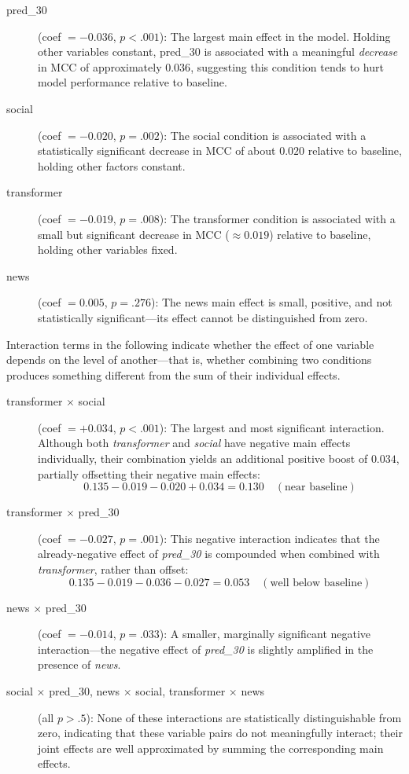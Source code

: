 \documentclass[stu,floatsintext]{apa7}
\begin{document}
\begin{description}
    \item[pred\_30] (coef $= -0.036$, $p < .001$): The largest main effect in the model. Holding other variables constant, pred\_30 is associated with a meaningful \textit{decrease} in MCC of approximately $0.036$, suggesting this condition tends to hurt model performance relative to baseline.

    \item[social] (coef $= -0.020$, $p = .002$): The social condition is associated with a statistically significant decrease in MCC of about $0.020$ relative to baseline, holding other factors constant.

    \item[transformer] (coef $= -0.019$, $p = .008$): The transformer condition is associated with a small but significant decrease in MCC ($\approx 0.019$) relative to baseline, holding other variables fixed.

    \item[news] (coef $= 0.005$, $p = .276$): The news main effect is small, positive, and not statistically significant---its effect cannot be distinguished from zero.
\end{description}

Interaction terms in the following indicate whether the effect of one variable depends on the level of another---that is, whether combining two conditions produces something different from the sum of their individual effects.

\begin{description}
    \item[transformer $\times$ social] (coef $= +0.034$, $p < .001$): The largest and most significant interaction. Although both \textit{transformer} and \textit{social} have negative main effects individually, their combination yields an additional positive boost of $0.034$, partially offsetting their negative main effects:
    \[
    0.135 - 0.019 - 0.020 + 0.034 = 0.130 \quad (\text{near baseline})
    \]

    \item[transformer $\times$ pred\_30] (coef $= -0.027$, $p = .001$): This negative interaction indicates that the already-negative effect of \textit{pred\_30} is compounded when combined with \textit{transformer}, rather than offset:
    \[
    0.135 - 0.019 - 0.036 - 0.027 = 0.053 \quad (\text{well below baseline})
    \]

    \item[news $\times$ pred\_30] (coef $= -0.014$, $p = .033$): A smaller, marginally significant negative interaction---the negative effect of \textit{pred\_30} is slightly amplified in the presence of \textit{news}.

    \item[social $\times$ pred\_30, news $\times$ social, transformer $\times$ news] (all $p > .5$): None of these interactions are statistically distinguishable from zero, indicating that these variable pairs do not meaningfully interact; their joint effects are well approximated by summing the corresponding main effects.
\end{description}
\end{document}
